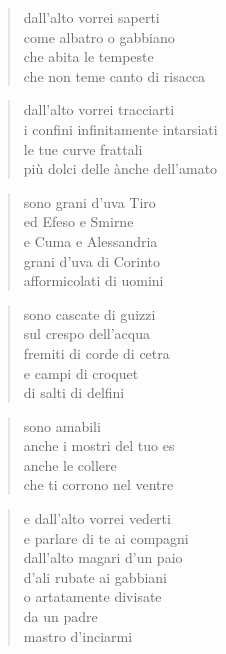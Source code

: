 \clearpage



	\begin{verse}
		dall’alto vorrei saperti\\
		come albatro o gabbiano\\
		che abita le tempeste\\
		che non teme canto di risacca
	\end{verse}

	\begin{verse}
		dall’alto vorrei tracciarti\\
		i confini infinitamente intarsiati\\
		le tue curve frattali\\
		più dolci delle ànche dell’amato
	\end{verse}

	\begin{verse}
		sono grani d’uva Tiro\\
		ed Efeso e Smirne\\
		e Cuma e Alessandria\\
		grani d’uva di Corinto\\
		afformicolati di uomini
	\end{verse}

	\begin{verse}
		sono cascate di guizzi\\
		sul crespo dell’acqua\\
		fremiti di corde di cetra\\
		e campi di croquet\\
		di salti di delfini
	\end{verse}

	\begin{verse}
		sono amabili\\
		anche i mostri del tuo es\\
		anche le collere\\
		che ti corrono nel ventre
	\end{verse}

	\begin{verse}
		e dall’alto vorrei vederti\\
		e parlare di te ai compagni\\
		dall’alto magari d’un paio\\
		d’ali rubate ai gabbiani\\
		o artatamente divisate\\
		da un padre\\
		mastro d’inciarmi
	\end{verse}

